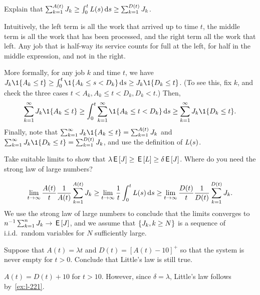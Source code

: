\begin{exercise}\label{ex:l-220}
Explain that $\sum_{k=1}^{A(t)} J_k \geq \int_0^t L(s) \,\textrm{d}s \geq \sum_{k=1}^{D(t)} J_k$.
\begin{solution}
 Intuitively, the left term is all the work that arrived up to time $t$, the middle term is all the work that has been processed, and the right term all the work that left.
 Any job that is half-way its service counts for full at the left, for half in the middle expression, and not in the right.

 More formally, for any job $k$ and time $t$, we have $\J_k \1{A_k \leq t} \geq \int_0^t \1{A_k \leq s < D_k } \d s \geq \J_k \1{D_k \leq t}$. (To see this, fix $k$, and check the three cases $t < A_k, A_k \leq t < D_k, D_k < t$.) Then,
 \begin{equation*}
 \sum_{k=1}^\infty \J_k \1{A_k \leq t} \geq \int_0^t \sum_{k=1}^\infty \1{A_k \leq t < D_k} \d s \geq \sum_{k=1}^\infty \J_k \1{D_k \leq t}. 
 \end{equation*}
 Finally, note that $ \sum_{k=1}^\infty \J_k \1{A_k \leq t} = \sum_{k=1}^{A(t)} \J_k$ and $ \sum_{k=1}^\infty \J_k \1{D_k \leq t} = \sum_{k=1}^{D(t)} \J_k$, and use the definition of $L(s)$.
\end{solution}
\end{exercise}

\begin{exercise}\label{ex:l-221}
Take suitable limits to show that 
$\lambda \,\mathsf{E}\left[J\right] \geq \,\mathsf{E}\left[L\right] \geq \delta \,\mathsf{E}\left[J\right]$.
 Where do you need the strong law of large numbers?
\begin{solution}
 \begin{equation*}
 \lim_{t\to\infty} \frac{A(t)}{t}\frac 1{A(t)}\sum_{k=1}^{A(t)} J_k \geq \lim_{t\to \infty} \frac 1 t \int_0^t L(s) \,\textrm{d}s \geq \lim_{t\to\infty} \frac{D(t)}{t}\frac 1{D(t)} \sum_{k=1}^{D(t)} J_k. 
 \end{equation*}
 We use the strong law of large numbers to conclude that the limits converges to $n^{-1} \sum_{k=1}^n J_k \to \,\mathsf{E}\left[J\right]$, and we assume that $\{J_k, k\geq N\}$ is a sequence of i.i.d.\ random variables for $N$ sufficiently large.
\end{solution}
\end{exercise}


\begin{exercise}\label{ex:l-222}
 Suppose that $A(t) = \lambda t$ and $D(t)= {[A(t) - 10]}^+$ so that the system is never empty for $t>0$. 
Conclude that   Little's law is still true. 
\begin{solution}
$A(t) = D(t) + 10$ for $t>10$.  However, since $\delta=\lambda$,  Little's law follows by~\cref{ex:l-221}.
\end{solution}
\end{exercise}




